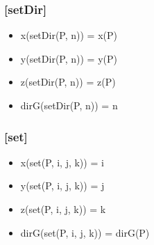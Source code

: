 \documentclass[11pt]{article}
\begin{document}
\subsubsection{[setDir]}
\label{sec-1.6.6}

\begin{itemize}

\item x(setDir(P, n)) = x(P)\\
\label{sec-1.6.6.1}


\item y(setDir(P, n)) = y(P)\\
\label{sec-1.6.6.2}


\item z(setDir(P, n)) = z(P)\\
\label{sec-1.6.6.3}


\item dirG(setDir(P, n)) = n\\
\label{sec-1.6.6.4}


\end{itemize} %
\subsubsection{[set]}
\label{sec-1.6.7}

\begin{itemize}

\item x(set(P, i, j, k)) = i\\
\label{sec-1.6.7.1}


\item y(set(P, i, j, k)) = j\\
\label{sec-1.6.7.2}


\item z(set(P, i, j, k)) = k\\
\label{sec-1.6.7.3}


\item dirG(set(P, i, j, k)) = dirG(P)\\
\label{sec-1.6.7.4}



\end{itemize} %
\end{document}
